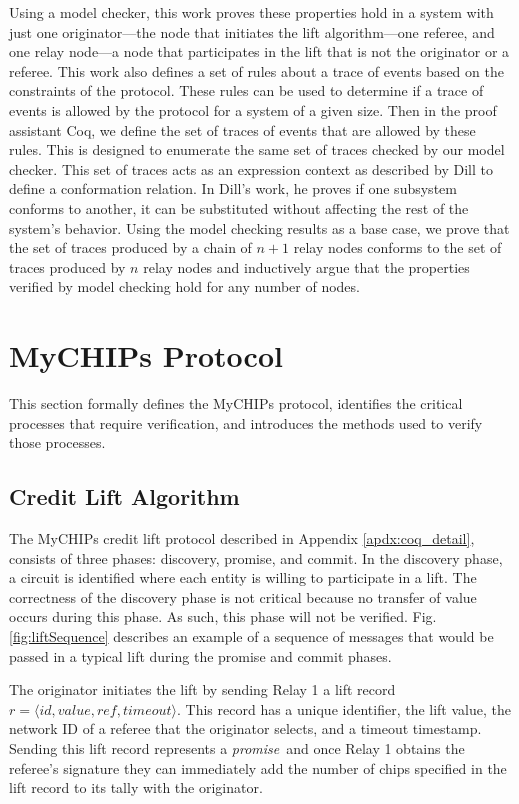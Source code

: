 \documentclass[runningheads]{llncs}
\newcommand{\promise}{\emph{promise}}
\begin{document}
Using a model checker, this work proves these properties hold in a system with just one originator---the node that initiates the lift algorithm---one referee, and one relay node---a node that participates in the lift that is not the originator or a referee. This work also defines a set of rules about a trace of events based on the constraints of the protocol. These rules can be used to determine if a trace of events is allowed by the protocol for a system of a given size. 
Then in the proof assistant Coq, we define the set of traces of events that are allowed by these rules. This is designed to enumerate the same set of traces checked by our model checker. This set of traces acts as an expression context as described by Dill \cite{dill_trace_theory} to define a conformation relation. In Dill's work, he proves if one subsystem conforms to another, it can be substituted without affecting the rest of the system's behavior. 
Using the model checking results as a base case, we prove that the set of traces produced by a chain of $n+1$ relay nodes conforms to the set of traces produced by $n$ relay nodes and inductively argue that the properties verified by model checking hold for any number of nodes.

\section{MyCHIPs Protocol}
\label{sec:protocol_def}
This section formally defines the MyCHIPs protocol, identifies the critical processes that require verification, and introduces the methods used to verify those processes.

\subsection{Credit Lift Algorithm}\label{sec:liftAlgorithm}
The MyCHIPs credit lift protocol described in Appendix \ref{apdx:coq_detail}, consists of three phases: discovery, promise, and commit. In the discovery phase, a circuit is identified where each entity is willing to participate in a lift. The correctness of the discovery phase is not critical because no transfer of value occurs during this phase. As such, this phase will not be verified.
Fig. \ref{fig:liftSequence} describes an example of a sequence of messages that would be passed in a typical lift during the promise and commit phases.

The originator initiates the lift by sending Relay 1 a lift record
\sloppy $r = \langle id, value, ref, timeout\rangle.$ This record has a unique identifier, the lift value, the network ID of a referee that the originator selects, and a timeout timestamp. Sending this lift record represents a \promise\ and once Relay 1 obtains the referee's signature they can immediately add the number of chips specified in the lift record to its tally with the originator.
\end{document}
